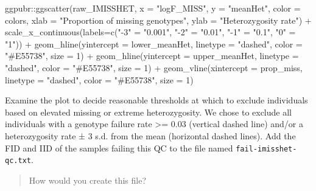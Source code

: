 \documentclass[
]{book}
\newenvironment{Shaded}{\begin{snugshade}}{\end{snugshade}}
\newcommand{\AttributeTok}[1]{\textcolor[rgb]{0.77,0.63,0.00}{#1}}
\newcommand{\DecValTok}[1]{\textcolor[rgb]{0.00,0.00,0.81}{#1}}
\newcommand{\FunctionTok}[1]{\textcolor[rgb]{0.00,0.00,0.00}{#1}}
\newcommand{\NormalTok}[1]{#1}
\newcommand{\OtherTok}[1]{\textcolor[rgb]{0.56,0.35,0.01}{#1}}
\newcommand{\SpecialCharTok}[1]{\textcolor[rgb]{0.00,0.00,0.00}{#1}}
\newcommand{\StringTok}[1]{\textcolor[rgb]{0.31,0.60,0.02}{#1}}
\begin{document}
\begin{Shaded}
\begin{Highlighting}[]
\NormalTok{ggpubr}\SpecialCharTok{::}\FunctionTok{ggscatter}\NormalTok{(raw\_IMISSHET, }\AttributeTok{x =} \StringTok{"logF\_MISS"}\NormalTok{, }\AttributeTok{y =} \StringTok{"meanHet"}\NormalTok{,}
                  \AttributeTok{color =}\NormalTok{ colors,}
                  \AttributeTok{xlab =} \StringTok{"Proportion of missing genotypes"}\NormalTok{, }\AttributeTok{ylab =} \StringTok{"Heterozygosity rate"}\NormalTok{) }\SpecialCharTok{+}
  \FunctionTok{scale\_x\_continuous}\NormalTok{(}\AttributeTok{labels=}\FunctionTok{c}\NormalTok{(}\StringTok{"{-}3"} \OtherTok{=} \StringTok{"0.001"}\NormalTok{, }\StringTok{"{-}2"} \OtherTok{=} \StringTok{"0.01"}\NormalTok{,}
                              \StringTok{"{-}1"} \OtherTok{=} \StringTok{"0.1"}\NormalTok{, }\StringTok{"0"} \OtherTok{=} \StringTok{"1"}\NormalTok{)) }\SpecialCharTok{+}
  \FunctionTok{geom\_hline}\NormalTok{(}\AttributeTok{yintercept =}\NormalTok{ lower\_meanHet, }\AttributeTok{linetype =} \StringTok{"dashed"}\NormalTok{,}
                \AttributeTok{color =} \StringTok{"\#E55738"}\NormalTok{, }\AttributeTok{size =} \DecValTok{1}\NormalTok{) }\SpecialCharTok{+}
  \FunctionTok{geom\_hline}\NormalTok{(}\AttributeTok{yintercept =}\NormalTok{ upper\_meanHet, }\AttributeTok{linetype =} \StringTok{"dashed"}\NormalTok{,}
                \AttributeTok{color =} \StringTok{"\#E55738"}\NormalTok{, }\AttributeTok{size =} \DecValTok{1}\NormalTok{) }\SpecialCharTok{+}
  \FunctionTok{geom\_vline}\NormalTok{(}\AttributeTok{xintercept =}\NormalTok{ prop\_miss, }\AttributeTok{linetype =} \StringTok{"dashed"}\NormalTok{,}
                \AttributeTok{color =} \StringTok{"\#E55738"}\NormalTok{, }\AttributeTok{size =} \DecValTok{1}\NormalTok{)}
\end{Highlighting}
\end{Shaded}

Examine the plot to decide reasonable thresholds at which to exclude individuals based on elevated missing or extreme heterozygosity. We chose to exclude all individuals with a genotype failure rate \textgreater= 0.03 (vertical dashed line) and/or a heterozygosity rate ± 3 s.d. from the mean (horizontal dashed lines). Add the FID and IID of the samples failing this QC to the file named \texttt{fail-imisshet-qc.txt}.

\begin{quote}
How would you create this file?
\end{quote}
\end{document}
